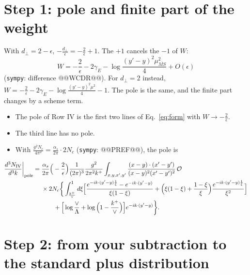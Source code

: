 \documentclass[10pt]{article}
\numberwithin{equation}{section}
\newcommand{\OO}{\mathcal O}
\newcommand{\preLO}{\frac{1}{(2\pi)^3}\frac{g^2}{2\pi^2k^+}}
\newcommand{\XX}{\frac{(x-y)\cdot(x'-y')}{(x-y)^{2}(x'-y')^{2}}}
\newcommand{\ph}{e^{-ik\cdot(y'-y)\frac{1}{\xi}}}
\newcommand{\phone}{e^{-ik\cdot(y'-y)}}
\begin{document}
\section{Step 1: pole and finite part of the weight}\label{sec:W}
With $d_\perp=2-\epsilon$, $-\frac{d_\perp}{\epsilon}=-\frac{2}{\epsilon}+1$. The $+1$ cancels the $-1$ of $W$:
\begin{equation}
W=-\frac{2}{\epsilon}-2\gamma_E-\log\frac{(y'-y)^2\mu^2_{\overline{MS}}}{4}+O(\epsilon)
\label{eq:W}
\end{equation}
(\texttt{sympy}: difference @@WCDR@@). For $d_\perp=2$ instead, $W=-\frac2\epsilon-2\gamma_E-\log\frac{(y'-y)^2\mu^2}{4}-1$. The pole is the same, and the finite part changes by a scheme term.
\begin{itemize}
\item The pole of Row IV is the first two lines of Eq.~\eqref{eq:form} with $W\to-\frac2\epsilon$.
\item The third line has no pole.
\item With $\frac{g^2N_c}{4\pi^2}=\frac{\alpha_s}{2\pi}\cdot2N_c$ (\texttt{sympy}: @@PREF@@), the pole is
\end{itemize}
\begin{align}
\frac{d^{3}N_{\rm IV}}{d^{3}k}\bigg|_{\rm pole}={}&\frac{\alpha_s}{2\pi}\Big(-\frac{2}{\epsilon}\Big)\preLO\int_{x,y,x',y'}\XX\,\OO\notag\\
&\times2N_c\bigg\{\int_{\frac{k^{+}}{\vee}}^{1}d\xi\Big[\frac{\ph-\phone}{\xi(1-\xi)}+\Big(\xi(1-\xi)+\frac{1-\xi}{\xi}\Big)\frac{\ph}{\xi^2}\Big]\notag\\
&\qquad+\Big[\log\frac{\vee}{\Lambda}+\log\Big(1-\frac{k^{+}}{\vee}\Big)\Big]\phone\bigg\}.
\label{eq:poleu}
\end{align}

\section{Step 2: from your subtraction to the standard plus distribution}\label{sec:conv}
\end{document}
